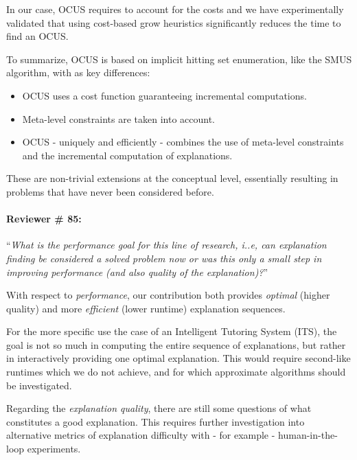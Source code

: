 \documentclass{article}
\begin{document}
In our case, OCUS requires to account for the costs and we have experimentally validated that using cost-based grow heuristics significantly reduces the time to find an OCUS.

To summarize, OCUS is based on implicit hitting set enumeration, like the SMUS algorithm, with as key differences: 
\begin{itemize}
	\item OCUS uses a cost function guaranteeing incremental computations.
	\item Meta-level constraints are taken into account.
	\item OCUS - uniquely and efficiently - combines the use of meta-level constraints and the incremental computation of explanations. 
\end{itemize}

These are non-trivial extensions at the conceptual level, essentially resulting in problems that have never been considered before.



\paragraph{Reviewer \# 85:}``\textit{What is the performance goal for this line of research, i..e, can explanation finding be considered a solved problem now or was this only a small step in improving performance (and also quality of the explanation)?}''

With respect to \textit{performance}, our contribution both provides \textit{optimal} (higher quality) and more \textit{efficient} (lower runtime) explanation sequences.

For the more specific use the case of an Intelligent Tutoring System (ITS), the goal is not so much in computing the entire sequence of explanations, but rather in interactively providing one optimal explanation. %
This would require second-like runtimes which we do not achieve, and for which approximate algorithms should be investigated.

Regarding the \textit{explanation quality}, there are still some questions of what constitutes a good explanation. This requires further investigation into alternative metrics of explanation difficulty with - for example - human-in-the-loop experiments.%
\end{document}

